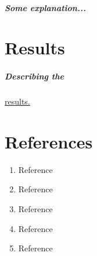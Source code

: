 \documentclass[11pt, a4paper]{article}
\begin{document}
\paragraph{Some explanation...}


\chapter{Results}
\paragraph{Describing the}\underline{results.}


\chapter{References}
\begin{enumerate}
\item{Reference}
\item{Reference}
\item{Reference}
\item{Reference}
\item{Reference}
\end{enumerate}
\end{document}
